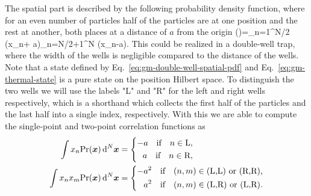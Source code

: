 The spatial part is described by the following probability density function, where for an even number of particles half of the particles are at one position and the rest at another, both places at a distance of $a$ from the origin
\be
  \prob()=\prod_{n=1}^{N/2} \delta(x_n+ a)\prod_{n=N/2+1}^{N} \delta(x_n-a).
  \label{eq:gm-double-well-spatial-pdf}
\ee
This could be realized in a double-well trap, where the width of the wells is negligible compared to the distance of the wells.
Note that a state defined by Eq.~\eqref{eq:gm-double-well-spatial-pdf} and Eq.~\eqref{eq:gm-thermal-state} is a pure state on the position Hilbert space.
To distinguish the two wells we will use the labels "L" and "R" for the left and right wells respectively, which is a shorthand which collects the first half of the particles and the last half into a single index, respectively.
With this we are able to compute the single-point and two-point correlation functions as
\begin{align}
  \int  x_n\text{Pr}(\boldsymbol{x})\,\text{d}^N\boldsymbol{x} &= \left\{
  \begin{aligned}
     -a \quad \text{if} \quad n\in \text{L},\\
      a \quad \text{if} \quad n\in \text{R},
  \end{aligned}\right.
  \label{eq:single-point-function-double-well}\\
  \int x_n x_m\text{Pr}(\boldsymbol{x})\,\text{d}^N\boldsymbol{x} &= \left\{
  \begin{aligned}
    -a^2 \quad \text{if} \quad (n,m)\in \text{(L,L) or (R,R),}\\
     a^2 \quad \text{if} \quad (n,m)\in \text{(L,R) or (L,R).}
  \end{aligned}
  \right.
  \label{eq:two-point-function-double-well}
\end{align}

